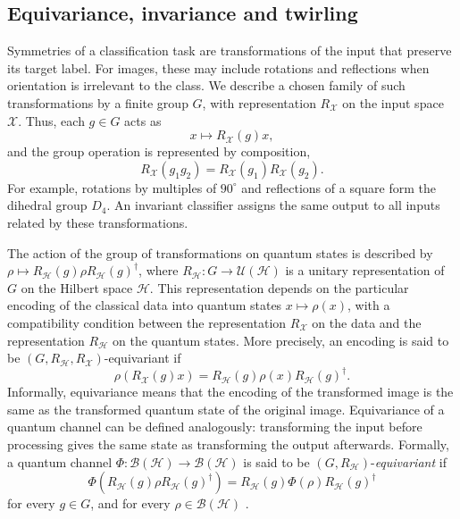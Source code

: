 \documentclass[aps,pra,reprint,superscriptaddress,longbibliography]{revtex4-2}
\newcommand{\Hi}{\mathcal{H}}
\newcommand{\RH}{R_{\Hi}}
\begin{document}
\subsection{Equivariance, invariance and twirling}\label{subsec:equivariance}
Symmetries of a classification task are transformations of the input
that preserve its target label. For images, these may include rotations
and reflections when orientation is irrelevant to the class. 
We describe a chosen family of such transformations by a finite group \(G\), with representation \(R_{\mathcal X}\) on the input space \(\mathcal X\). Thus, each \(g\in G\) acts as
\begin{equation}
x\mapsto R_{\mathcal X}(g)x,
\end{equation}
and the group operation is represented by composition,
\begin{equation}
R_{\mathcal X}(g_1g_2)=R_{\mathcal X}(g_1)R_{\mathcal X}(g_2).
\end{equation}
For example, rotations
by multiples of $90^\circ$ and reflections of a square form the
dihedral group $D_4$. An invariant classifier assigns the same output
to all inputs related by these transformations.

The action of the group of transformations on quantum states is described by
$\rho\mapsto R_{\Hi}(g)\rho R_{\Hi}(g)^\dagger$, where $R_{\Hi} \colon G\to\mathcal{U}(\Hi)$ is a  unitary representation of $G$ on
the Hilbert space $\Hi$. This representation depends on the particular encoding of the classical data into quantum states $x\mapsto \rho(x)$, with a compatibility condition between the representation $R_\mathcal{X}$ on the data and the representation $\RH$ on the quantum states. More precisely, an encoding is said to be $(G,\RH,R_{\mathcal{X}})$-equivariant if 
\begin{equation}
    \rho(R_{\mathcal{X}}(g)x)=\RH(g)\rho(x)\RH(g)^\dagger.
\end{equation}
Informally, equivariance means that the encoding of the transformed image is the same as the transformed quantum state of the original image. Equivariance of a quantum channel can be defined analogously: 
transforming the input before processing gives the same state as
transforming the output afterwards. Formally, a quantum channel $\Phi:\mathcal{B}(\Hi)\rightarrow\mathcal{B}(\Hi)$ is said to be $(G,\RH)$-\emph{equivariant} if
\begin{equation}
\label{eq:equivariant_channel}
    \Phi(\RH(g)\rho \RH(g)^\dagger)=\RH(g)\Phi(\rho)\RH(g)^\dagger
\end{equation}
for every $g\in G$, and for every $\rho\in\mathcal{B}(\Hi)$ \citep{larocca2022group,meyer2023exploiting,nguyen2024theory}.
\end{document}
